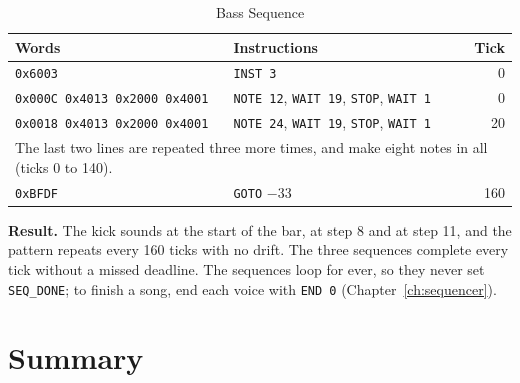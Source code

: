 \begin{table}[H]
	\centering
	\small
	\begin{tabular}{p{6.7cm}p{4.3cm}r}
		\toprule
		\textbf{Words}                       & \textbf{Instructions}                                              & \textbf{Tick} \\
		\midrule
		\texttt{0x6003}                      & \texttt{INST 3}                                                    & 0             \\
		\texttt{0x000C 0x4013 0x2000 0x4001} & \texttt{NOTE 12}, \texttt{WAIT 19}, \texttt{STOP}, \texttt{WAIT 1} & 0             \\
		\texttt{0x0018 0x4013 0x2000 0x4001} & \texttt{NOTE 24}, \texttt{WAIT 19}, \texttt{STOP}, \texttt{WAIT 1} & 20            \\
		\multicolumn{3}{l}{The last two lines are repeated three more times, and make eight notes in all (ticks 0 to 140).}       \\
		\texttt{0xBFDF}                      & \texttt{GOTO} $-33$                                                & 160           \\
		\bottomrule
	\end{tabular}
	\caption{Bass Sequence}
	\label{tab:ex-bass-pattern}
\end{table}

\textbf{Result.} The kick sounds at the start of the bar, at step 8 and at step 11, and the pattern repeats every
160 ticks with no drift. The three sequences complete every tick without a missed deadline. The sequences loop for
ever, so they never set \texttt{SEQ\_DONE}; to finish a song, end each voice with \texttt{END 0} (Chapter~\ref{ch:sequencer}).

\section{Summary}

